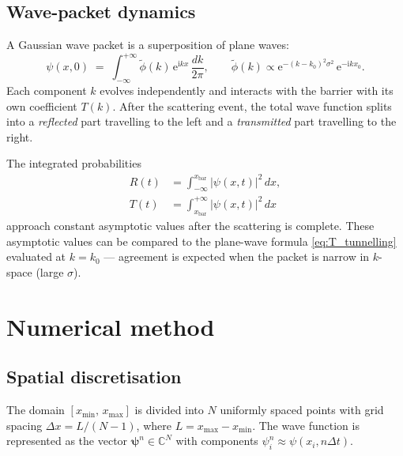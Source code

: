 \documentclass[12pt, a4paper]{article}
\newcommand{\dt}{\Delta t}
\newcommand{\dx}{\Delta x}
\newcommand{\ii}{\mathrm{i}}          %
\newcommand{\ee}{\mathrm{e}}          %
\begin{document}
\subsection{Wave-packet dynamics}

A Gaussian wave packet is a superposition of plane waves:
\begin{equation}
  \psi(x,0) \;=\; \int_{-\infty}^{+\infty}
  \tilde{\phi}(k)\,\ee^{\ii kx}\,\frac{dk}{2\pi},
  \qquad
  \tilde{\phi}(k) \propto \ee^{-(k-k_0)^2\sigma^2}\,\ee^{-\ii k x_0}.
\end{equation}
Each component $k$ evolves independently and interacts with the barrier
with its own coefficient $T(k)$.  After the scattering event, the total
wave function splits into a \emph{reflected} part travelling to the left
and a \emph{transmitted} part travelling to the right.

The integrated probabilities
\begin{align}
  R(t) &= \int_{-\infty}^{x_\text{bar}} |\psi(x,t)|^2\,dx, \\
  T(t) &= \int_{x_\text{bar}}^{+\infty} |\psi(x,t)|^2\,dx
\end{align}
approach constant asymptotic values after the scattering is complete.
These asymptotic values can be compared to the plane-wave formula
\eqref{eq:T_tunnelling} evaluated at $k = k_0$ — agreement is expected
when the packet is narrow in $k$-space (large $\sigma$).

\section{Numerical method}

\subsection{Spatial discretisation}

The domain $[x_\text{min},\, x_\text{max}]$ is divided into $N$ uniformly
spaced points with grid spacing $\dx = L/(N-1)$, where $L =
x_\text{max} - x_\text{min}$.  The wave function is represented as the
vector $\boldsymbol{\psi}^n \in \mathbb{C}^N$ with components
$\psi_i^n \approx \psi(x_i, n\dt)$.
\end{document}

